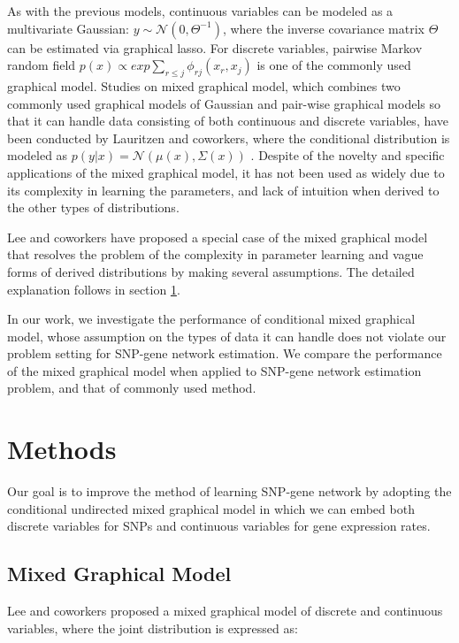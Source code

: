 \documentclass{article}
\begin{document}
As with the previous models, continuous variables can be modeled as a multivariate Gaussian: $y \sim \mathcal{N}(0, \Theta^{-1})$, where the inverse covariance matrix $\Theta$ can be estimated via graphical lasso. For discrete variables, pairwise Markov random field $p(x) \propto exp \sum_{r\leq j} \phi_{rj}(x_r, x_j)$ is one of the commonly used graphical model.
Studies on mixed graphical model, which combines two commonly used graphical models of Gaussian and pair-wise graphical models so that it can handle data consisting of both continuous and discrete variables, have been conducted by Lauritzen and coworkers, where the conditional distribution is modeled as $p(y|x) = \mathcal{N}(\mu(x), \Sigma(x))$ \cite{lauritzen1989graphical}.
Despite of the novelty and specific applications of the mixed graphical model, it has not been used as widely due to its complexity in learning the parameters, and lack of intuition when derived to the other types of distributions.

Lee and coworkers \cite{lee2013structure} have proposed a special case of the mixed graphical model that resolves the problem of the complexity in parameter learning and vague forms of derived distributions by making several assumptions.
 The detailed explanation follows in section \ref{Methods}.
 
In our work, we investigate the performance of conditional mixed graphical model, whose assumption on the types of data it can handle does not violate our problem setting for SNP-gene network estimation. We compare the performance of the mixed graphical model when applied to SNP-gene network estimation problem, and that of commonly used method.


\section{Methods}
\label{Methods}
Our goal is to improve the method of learning SNP-gene network by adopting the conditional undirected mixed graphical model in which we can embed both discrete variables for SNPs and continuous variables for gene expression rates.

\subsection{Mixed Graphical Model}
Lee and coworkers \cite{lee2013structure} proposed a mixed graphical model of discrete and continuous variables, where the joint distribution is expressed as:
\end{document}

